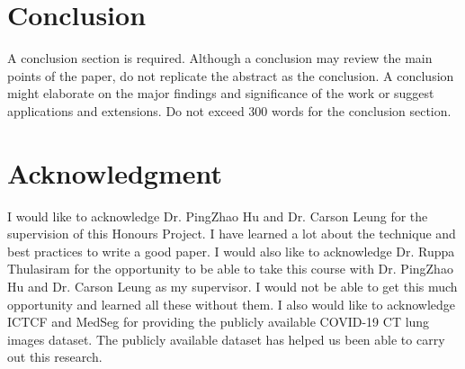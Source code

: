 \section{Conclusion}
A conclusion section is required. Although a conclusion may review the main points of the paper, do not replicate the abstract as the conclusion. A conclusion might elaborate on the major findings and significance of the work or suggest applications and extensions. Do not exceed 300 words for the conclusion section.

\section{Acknowledgment}
I would like to acknowledge Dr. PingZhao Hu and Dr. Carson Leung for the supervision of this Honours Project. I have learned a lot about the technique and best practices to write a good paper. I would also like to acknowledge Dr. Ruppa Thulasiram for the opportunity to be able to take this course with Dr. PingZhao Hu and Dr. Carson Leung as my supervisor. I would not be able to get this much opportunity and learned all these without them. I also would like to acknowledge ICTCF and MedSeg for providing the publicly available COVID-19 CT lung images dataset. The publicly available dataset has helped us been able to carry out this research.